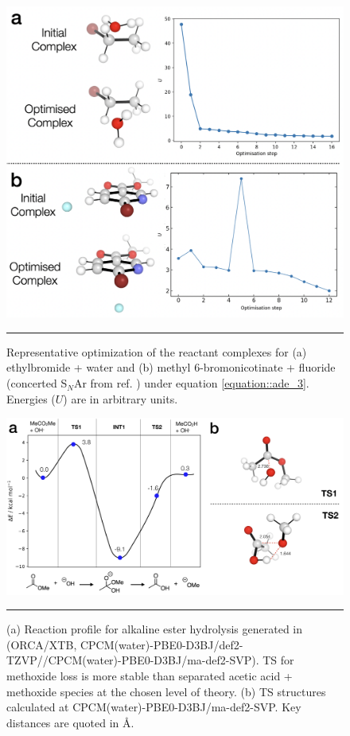 \documentclass[../../main.tex]{subfiles}
\begin{document}
\begin{figure}[h!]
	\vspace{0.4cm}
	\centering
	\includegraphics[width=12cm]{5/autode/figs/figS9}
	\vspace{0.4cm}
	\hrule
	\caption{Representative optimization of the reactant complexes for (a) ethylbromide + water and (b) methyl 6-bromonicotinate + fluoride (concerted S$_N$Ar from ref. \cite{Kwan2018}) under equation \eqref{equation::ade_3}. Energies ($U$) are in arbitrary units.}
	\label{fig::ade_si_9}
\end{figure}



\begin{figure}[h!]
	\vspace{0.4cm}
	\centering
	\includegraphics[width=\textwidth]{5/autode/figs/figS10}
	\vspace{0.4cm}
	\hrule
	\caption{(a) Reaction profile for alkaline ester hydrolysis generated in \ade (ORCA/XTB, CPCM(water)-PBE0-D3BJ/def2-TZVP//CPCM(water)-PBE0-D3BJ/ma-def2-SVP). TS for methoxide loss is more stable than separated acetic acid + methoxide species at the chosen level of theory. (b) TS structures calculated at CPCM(water)-PBE0-D3BJ/ma-def2-SVP. Key distances are quoted in \AA.}
	\label{fig::ade_si_10}
\end{figure}
\end{document}
